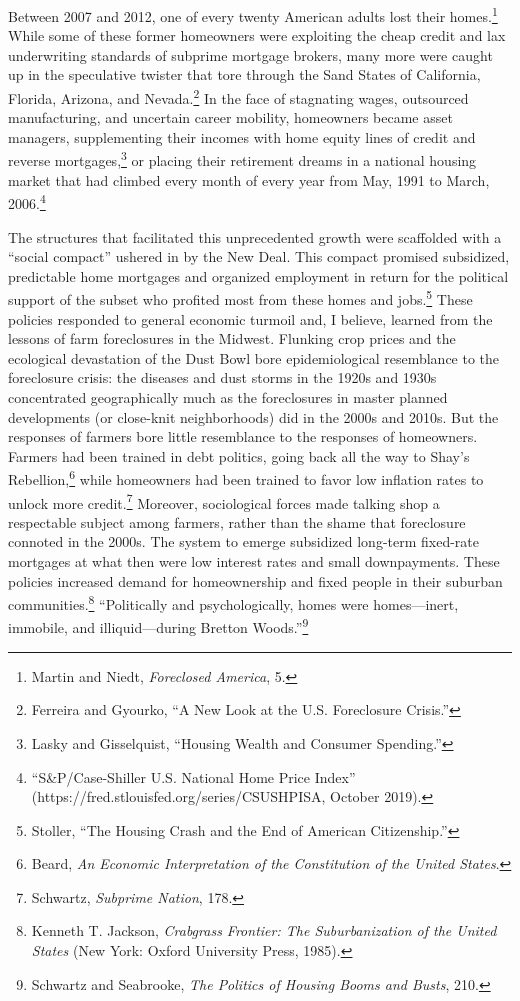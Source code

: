 \documentclass[12pt,oneside]{psthesis}
\begin{document}
Between 2007 and 2012, one of every twenty American adults lost their homes.\footnote{Martin and Niedt, \emph{Foreclosed America}, 5.}
While some of these former homeowners were exploiting the cheap credit and lax underwriting standards of subprime mortgage brokers, many more were caught up in the speculative twister that tore through the Sand States of California, Florida, Arizona, and Nevada.\footnote{Ferreira and Gyourko, ``A New Look at the U.S. Foreclosure Crisis.''}
In the face of stagnating wages, outsourced manufacturing, and uncertain career mobility, homeowners became asset managers, supplementing their incomes with home equity lines of credit and reverse mortgages,\footnote{Lasky and Gisselquist, ``Housing Wealth and Consumer Spending.''} or placing their retirement dreams in a national housing market that had climbed every month of every year from May, 1991 to March, 2006.\footnote{``S\&P/Case-Shiller U.S. National Home Price Index'' (https://fred.stlouisfed.org/series/CSUSHPISA, October 2019).}

The structures that facilitated this unprecedented growth were scaffolded with a ``social compact'' ushered in by the New Deal.
This compact promised subsidized, predictable home mortgages and organized employment in return for the political support of the subset who profited most from these homes and jobs.\footnote{Stoller, ``The Housing Crash and the End of American Citizenship.''}
These policies responded to general economic turmoil and, I believe, learned from the lessons of farm foreclosures in the Midwest.
Flunking crop prices and the ecological devastation of the Dust Bowl bore epidemiological resemblance to the foreclosure crisis: the diseases and dust storms in the 1920s and 1930s concentrated geographically much as the foreclosures in master planned developments (or close-knit neighborhoods) did in the 2000s and 2010s.
But the responses of farmers bore little resemblance to the responses of homeowners.
Farmers had been trained in debt politics, going back all the way to Shay's Rebellion,\footnote{Beard, \emph{An Economic Interpretation of the Constitution of the United States}.} while homeowners had been trained to favor low inflation rates to unlock more credit.\footnote{Schwartz, \emph{Subprime Nation}, 178.}
Moreover, sociological forces made talking shop a respectable subject among farmers, rather than the shame that foreclosure connoted in the 2000s.
The system to emerge subsidized long-term fixed-rate mortgages at what then were low interest rates and small downpayments.
These policies increased demand for homeownership and fixed people in their suburban communities.\footnote{Kenneth T. Jackson, \emph{Crabgrass Frontier: The Suburbanization of the United States} (New York: Oxford University Press, 1985).}
``Politically and psychologically, homes were homes---inert, immobile, and illiquid---during Bretton Woods.''\footnote{Schwartz and Seabrooke, \emph{The Politics of Housing Booms and Busts}, 210.}
\end{document}
